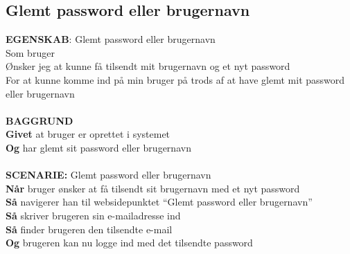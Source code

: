 \subsection{Glemt password eller brugernavn}
{\color{blue}\textbf{EGENSKAB}:} Glemt password eller brugernavn \\
Som bruger \\
Ønsker jeg at kunne få tilsendt mit brugernavn og et nyt password \\
For at kunne komme ind på min bruger på trods af at have glemt mit password eller brugernavn\\ \\
{\color{blue}\textbf{BAGGRUND}} \\
{\color{blue}\textbf{Givet}} at bruger er oprettet i systemet \\ {\color{blue}\textbf{Og}} har glemt sit password eller brugernavn \\
 \\
{\color{blue}\textbf{SCENARIE:}} Glemt password eller brugernavn \\
{\color{blue}\textbf{Når}} bruger ønsker at få tilsendt sit brugernavn med et nyt password \\
{\color{blue}\textbf{Så}} navigerer han til websidepunktet  “Glemt password eller brugernavn” \\
{\color{blue}\textbf{Så}} skriver brugeren sin e-mailadresse ind\\
{\color{blue}\textbf{Så}} finder brugeren den tilsendte e-mail \\
{\color{blue}\textbf{Og}} brugeren kan nu logge ind med det tilsendte password